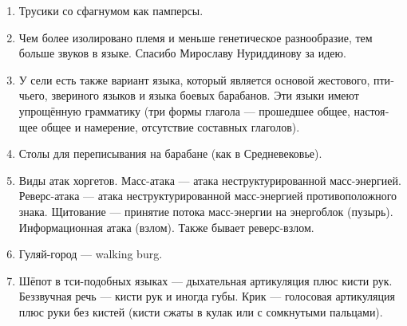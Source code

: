 \documentclass[a4paper,12pt,fleqn]{book}\usepackage{polyglossia}\setdefaultlanguage[babelshorthands=true]{russian}\setotherlanguage{english}\defaultfontfeatures{Ligatures=TeX,Mapping=tex-text}\usepackage{xcolor}\newcommand{\ml}[3]{#2}
\begin{document}
{\begin{enumerate}
\begin{enumerate}
\item концепция <<<бесконечного облака>> --- сапиент представляет собой квантовое облако, не имеющее чёткого края ни в пространстве, ни во временном фрактале.
Другими словами, сапиент представляет собой совокупность своего возможного прошлого и своего возможного будущего;
\item концепция <<одинокого странника>> --- сапиент представляет собой точечное сознание, перемещающееся по ветвям временного фрактала.
Считается, что каждая Вселенная содержит только одно сознание, все прочие живые --- лишь бессознательные тени.
\item Концепция Единого --- сапиент отождествляется с Тензором вплоть до полного стирания индивидуальности.                                                                                                            \end{enumerate}

Второй и третий вариант чаще всего характерны для различных монашеских орденов.

\item Трусики со сфагнумом как памперсы.

\item Чем более изолировано племя и меньше генетическое разнообразие, тем больше звуков в языке.
Спасибо Мирославу Нуриддинову за идею.

\item У сели есть также вариант языка, который является основой жестового, птичьего, звериного языков и языка боевых барабанов.
Эти языки имеют упрощённую грамматику (три формы глагола --- прошедшее общее, настоящее общее и намерение, отсутствие составных глаголов).

\item Столы для переписывания на барабане (как в Средневековье).

\item Виды атак хоргетов.
Масс-атака --- атака неструктурированной масс-энергией.
Реверс-атака --- атака неструктурированной масс-энергией противоположного знака.
Щитование --- принятие потока масс-энергии на энергоблок (пузырь).
Информационная атака (взлом).
Также бывает реверс-взлом.

\item Гуляй-город --- walking burg.

\item Шёпот в тси-подобных языках --- дыхательная артикуляция плюс кисти рук.
Беззвучная речь --- кисти рук и иногда губы.
Крик --- голосовая артикуляция плюс руки без кистей (кисти сжаты в кулак или с сомкнутыми пальцами).


\end{enumerate}}
\end{document}
